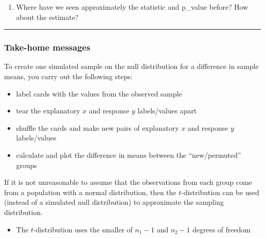 \documentclass[
  letterpaper,
  DIV=11,
  numbers=noendperiod]{scrartcl}
\providecommand{\tightlist}{%
  \setlength{\itemsep}{0pt}\setlength{\parskip}{0pt}}\usepackage{longtable,booktabs,array}
\begin{document}
\begin{enumerate}
\def\labelenumi{\arabic{enumi}.}
\setcounter{enumi}{28}
\tightlist
\item
  Where have we seen approximately the statistic and p\_value before?
  How about the estimate?
\end{enumerate}

\vspace{0.8in}

\begin{center}\rule{0.5\linewidth}{0.5pt}\end{center}

\hypertarget{take-home-messages}{%
\subsubsection{Take-home messages}\label{take-home-messages}}

To create one simulated sample on the null distribution for a difference
in sample means, you carry out the following steps:

\begin{itemize}
\tightlist
\item
  label cards with the values from the observed sample
\item
  tear the explanatory \(x\) and response \(y\) labels/values apart
\item
  shuffle the cards and make new pairs of explanatory \(x\) and response
  \(y\) labels/values
\item
  calculate and plot the difference in means between the
  ``new/permuted'' groups
\end{itemize}

If it is not unreasonable to assume that the observations from each
group come from a population with a normal distribution, then the
\(t\)-distribution can be used (instead of a simulated null
distribution) to approximate the sampling distribution.

\begin{itemize}
\tightlist
\item
  The \(t\)-distribution uses the smaller of \(n_1 - 1\) and \(n_2 - 1\)
  degrees of freedom
\end{itemize}
\end{document}
